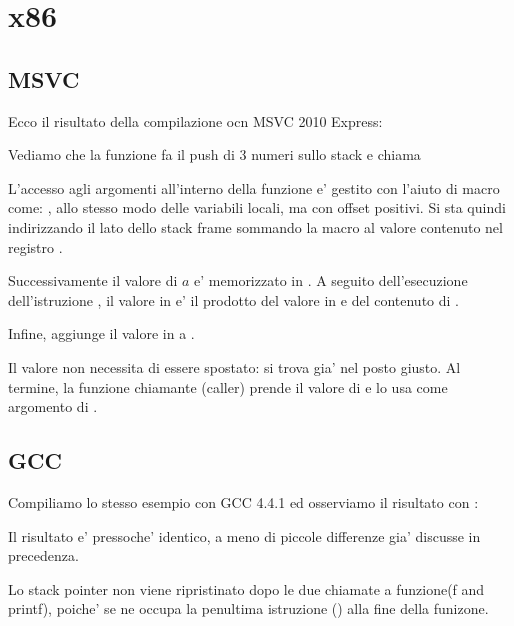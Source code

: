 \section{x86}

\subsection{MSVC}

Ecco il risultato della compilazione ocn MSVC 2010 Express:




Vediamo che la funzione \main fa il push di 3 numeri sullo stack e chiama  

L'accesso agli argomenti all'interno della funzione \ttf e' gestito con l'aiuto di macro come: , 
allo stesso modo delle variabili locali, ma con offset positivi.
Si sta quindi indirizzando il lato  dello \gls{stack frame} sommando la macro  al valore contenuto nel registro \EBP.


Successivamente il valore di $a$ e' memorizzato in \EAX. A seguito dell'esecuzione dell'istruzione \IMUL, il valore in \EAX e' 
il \gls{prodotto} del valore in \EAX e del contenuto di .

Infine, \ADD aggiunge il valore in  a \EAX.

Il valore \EAX non necessita di essere spostato: si trova gia' nel posto giusto.
Al termine, la funzione chiamante (\gls{caller}) prende il valore di \EAX e lo usa come argomento di \printf.



\subsection{GCC}

Compiliamo lo stesso esempio con GCC 4.4.1 ed osserviamo il risultato con \IDA:



Il risultato e' pressoche' identico, a meno di piccole differenze gia' discusse in precedenza.

Lo \gls{stack pointer} non viene ripristinato dopo le due chiamate a funzione(f and printf), 
poiche' se ne occupa la penultima istruzione  () alla fine della funizone.
